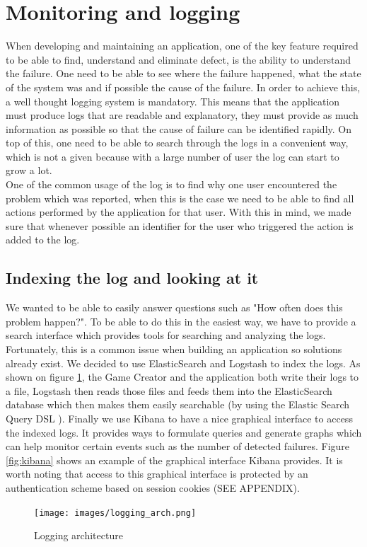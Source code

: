 \section{Monitoring and logging}\label{sec:logging}
When developing and maintaining an application, one of the key feature required to be able to find, understand and eliminate defect, is the ability to understand the failure. One need to be able to see where the failure happened, what the state of the system was and if possible the cause of the failure. In order to achieve this, a well thought logging system is mandatory. This means that the application must produce logs that are readable and explanatory, they must provide as much information as possible so that the cause of failure can be identified rapidly. On top of this, one need to be able to search through the logs in a convenient way, which is not a given because with a large number of user the log can start to grow a lot.\\
One of the common usage of the log is to find why one user encountered the problem which was reported, when this is the case we need to be able to find all actions performed by the application for that user. With this in mind, we made sure that whenever possible an identifier for the user who triggered the action is added to the log.
\subsection{Indexing the log and looking at it}
We wanted to be able to easily answer questions such as "How often does this problem happen?". To be able to do this in the easiest way, we have to provide a search interface which provides tools for searching and analyzing the logs. Fortunately, this is a common issue when building an application so solutions already exist. We decided to use ElasticSearch\cite{elasticsearch} and Logstash\cite{logstash} to index the logs. As shown on figure \ref{fig:loggingArch}, the Game Creator and the application both write their logs to a file, Logstash then reads those files and feeds them into the ElasticSearch database which then makes them easily searchable (by using the Elastic Search Query DSL \cite{querydsl}). Finally we use Kibana\cite{kibana} to have a nice graphical interface to access the indexed logs. It provides ways to formulate queries and generate graphs which can help monitor certain events such as the number of detected failures. Figure \ref{fig:kibana} shows an example of the graphical interface Kibana provides. It is worth noting that access to this graphical interface is protected by an authentication scheme based on session cookies (SEE APPENDIX).%
\begin{figure}
\centering
{\texttt{[image: images/logging\_arch.png]}}
\caption{Logging architecture}
\label{fig:loggingArch}
\end{figure}

